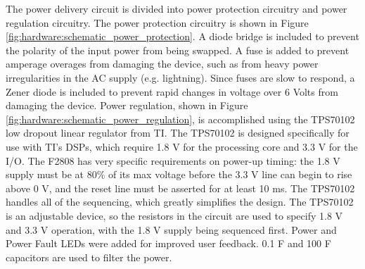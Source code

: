The power delivery circuit is divided into power protection circuitry and power regulation circuitry. The power protection circuitry is shown in Figure \ref{fig:hardware:schematic_power_protection}. A diode bridge is included to prevent the polarity of the input power from being swapped. A fuse is added to prevent amperage overages from damaging the device, such as from heavy power irregularities in the AC supply (e.g. lightning). Since fuses are slow to respond, a Zener diode is included to prevent rapid changes in voltage over 6 Volts from damaging the device. Power regulation, shown in Figure \ref{fig:hardware:schematic_power_regulation}, is accomplished using the TPS70102 low dropout linear regulator from TI. The TPS70102 is designed specifically for use with TI's DSPs, which require 1.8 V for the processing core and 3.3 V for the I/O. The F2808 has very specific requirements on power-up timing: the 1.8 V supply must be at 80\% of its max voltage before the 3.3 V line can begin to rise above 0 V, and the reset line must be asserted for at least 10 ms. The TPS70102 handles all of the sequencing, which greatly simplifies the design. The TPS70102 is an adjustable device, so the resistors in the circuit are used to specify 1.8 V and 3.3 V operation, with the 1.8 V supply being sequenced first. Power and Power Fault LEDs were added for improved user feedback. 0.1 \textmu F and 100 \textmu F capacitors are used to filter the power.\cite{ref:2007-ti-tps70102}

